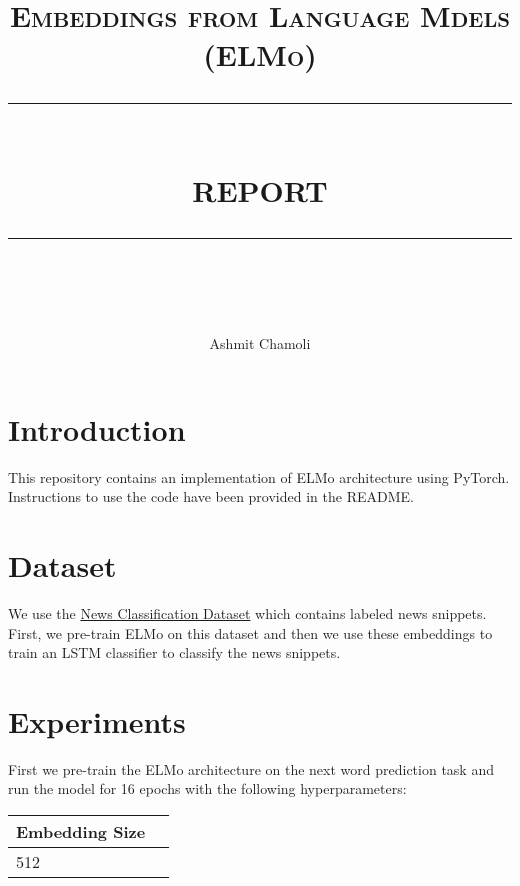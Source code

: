 \documentclass[a4paper,9pt]{report}
\newcommand{\HRule}[1]{\rule{\linewidth}{#1}}
\begin{document}
\title{ \normalsize \textsc{\LARGE Embeddings from Language Mdels (ELMo)}
		\\ [2.0cm]
		\HRule{0.5pt} \\
		\LARGE \textbf{\uppercase{Report}}
		\HRule{2pt} \\ [0.5cm]
		\normalsize \vspace*{3\baselineskip}}
        \date{ }

\author{Ashmit Chamoli\\ }

\maketitle
\section*{Introduction}
This repository contains an implementation of ELMo architecture using PyTorch. Instructions to use the code have been provided in the README.


\section*{Dataset}
We use the \href{https://iiitaphyd-my.sharepoint.com/:u:/g/personal/advaith_malladi_research_iiit_ac_in/EWjgIboHC19Ppq6Of9klUo4BlKgAqynxC0TRBURzQ0lEzA?e=tWZqY5}{News Classification Dataset} which contains labeled news snippets. 
First, we pre-train ELMo on this dataset and then we use these embeddings to train an LSTM classifier to classify the news snippets.

\section*{Experiments}
First we pre-train the ELMo architecture on the next word prediction task and run the model for 16 epochs with the following hyperparameters:
\begin{table}[H]
    \centering
    \begin{tabular}{|l|l|}
        \hline
        \textbf{Embedding Size} \\ \hline
        512 \\ \hline
    \end{tabular}
\end{table}
\end{document}

